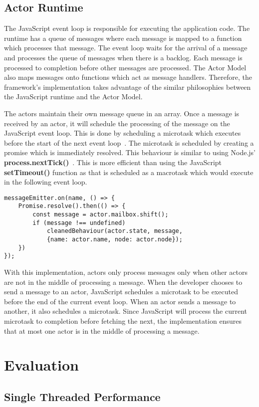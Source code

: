 \documentclass[12pt, a4paper]{report}
\theoremstyle{definition}
\theoremstyle{definition}%
\theoremstyle{definition}%
\theoremstyle{definition}%
\theoremstyle{definition}%
\theoremstyle{definition}%
\begin{document}
\section{Actor Runtime}
The JavaScript event loop is responsible for executing the application code. The runtime has a queue of messages where each message is mapped to a function which processes that message. The event loop waits for the arrival of a message and processes the queue of messages when there is a backlog. Each message is processed to completion before other messages are processed. The Actor Model also maps messages onto functions which act as message handlers. Therefore, the framework's implementation takes advantage of the similar philosophies between the JavaScript runtime and the Actor Model.

The actors maintain their own message queue in an array. Once a message is received by an actor, it will schedule the processing of the message on the JavaScript event loop. This is done by scheduling a microtask which executes before the start of the next event loop~\cite{eventloopbrowser}\cite{eventloopnode}. The microtask is scheduled by creating a promise which is immediately resolved. This behaviour is similar to using Node.js' \textbf{process.nextTick()}~\cite{nexttick}. This is more efficient than using the JavaScript \textbf{setTimeout()} function as that is scheduled as a macrotask which would execute in the following event loop.
\begin{lstlisting}
messageEmitter.on(name, () => {
    Promise.resolve().then(() => {
        const message = actor.mailbox.shift();
        if (message !== undefined)
            cleanedBehaviour(actor.state, message, 
            {name: actor.name, node: actor.node});
    })
});
\end{lstlisting}

With this implementation, actors only process messages only when other actors are not in the middle of processing a message. When the developer chooses to send a message to an actor, JavaScript schedules a microtask to be executed before the end of the current event loop. When an actor sends a message to another, it also schedules a microtask. Since JavaScript will process the current microtask to completion before fetching the next, the implementation ensures that at most one actor is in the middle of processing a message.
\chapter{Evaluation}
\section{Single Threaded Performance}
\end{document}
